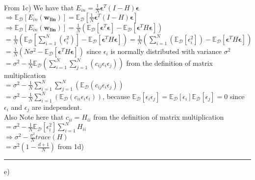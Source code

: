 \documentclass{article}
\begin{document}
From 1c) We have that $E_{in} = \frac{1}{N} \bm{\epsilon}^T(I-H)\bm{\epsilon}$
\\
$ \Rightarrow \mathbb{E}_{\mathcal{D}} [ E_{in}(\bm{w_{lin}}) ] = \mathbb{E}_{\mathcal{D}}[\frac{1}{N} \bm{\epsilon}^T(I-H)\bm{\epsilon}] $ \\ 
$\Rightarrow \mathbb{E}_{\mathcal{D}} [ E_{in}(\bm{w_{lin}}) ] = \frac{1}{N} ( \mathbb{E}_{\mathcal{D}}[\bm{\epsilon}^T \bm{\epsilon}]  - \mathbb{E}_{\mathcal{D}}[\bm{\epsilon}^TH\bm{\epsilon}])$ \\
$ = \frac{1}{N}( \mathbb{E}_{\mathcal{D}}[\sum_{i=1}^N(\epsilon_i^2)] - \mathbb{E}_{\mathcal{D}}[\bm{\epsilon}^TH\bm{\epsilon}] ) = \frac{1}{N}( \sum_{i=1}^N(\mathbb{E}_{\mathcal{D}}[\epsilon_i^2]) -\mathbb{E}_{\mathcal{D}}[\bm{\epsilon}^TH\bm{\epsilon}] )$ \\ 
$ = \frac{1}{N}(N\sigma^2 - \mathbb{E}_{\mathcal{D}}[\bm{\epsilon}^TH\bm{\epsilon}])$ since $\epsilon_i$ is normally distributed with variance $\sigma^2$ \\ 
$ = \sigma^2 - \frac{1}{N}\mathbb{E}_{\mathcal{D}}(\sum_{i=1}^N \sum_{j=1}^N (c_{ij} \epsilon_i \epsilon_j))$ from the definition of matrix multiplication \\ 
$ = \sigma^2 - \frac{1}{N} \sum_{i=1}^N \sum_{j=1}^N (\mathbb{E}_{\mathcal{D}} (c_{ij} \epsilon_i \epsilon_j))$ \\ 
$ = \sigma^2 - \frac{1}{N} \sum_{i=1}^N(\mathbb{E}_{\mathcal{D}} (c_{ii} \epsilon_i \epsilon_i))$, because $\mathbb{E}_{\mathcal{D}}[\epsilon_i\epsilon_j] =  \mathbb{E}_{\mathcal{D}}[\epsilon_i]\mathbb{E}_{\mathcal{D}}[\epsilon_j] = 0$ since $\epsilon_i$ and $\epsilon_j$ are independent.
\\ Also Note here that $c_{ii} = H_{ii}$ from the definition of matrix multiplication \\
$ = \sigma^2 - \frac{1}{N}\mathbb{E}_{\mathcal{D}}[\epsilon_i^2] \sum_{i=1}^N H_{ii}$ \\ 
$\Rightarrow \sigma^2 - \frac{\sigma^2}{N}trace(H) $ \\ 
$=\sigma^2(1-\frac{d+1}{N})$ from 1d) 

\par\noindent\rule{\textwidth}{0.4pt}

e) \\ 
\end{document}
